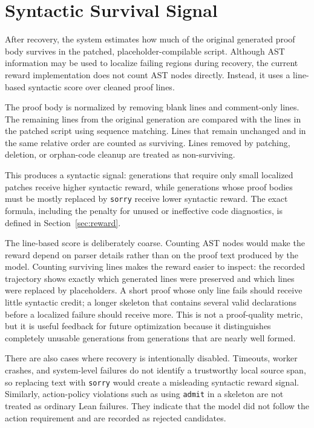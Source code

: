 \documentclass[en]{uet_awesome_thesis/uet-awesome-thesis}
\begin{document}
\section{Syntactic Survival Signal}

After recovery, the system estimates how much of the original generated proof body survives in the
patched, placeholder-compilable script. Although AST information may be used to localize failing
regions during recovery, the current reward implementation does not count AST nodes directly.
Instead, it uses a line-based syntactic score over cleaned proof lines.

The proof body is normalized by removing blank lines and comment-only lines. The remaining lines
from the original generation are compared with the lines in the patched script using sequence matching.
Lines that remain unchanged and in the same relative order are counted as surviving. Lines removed
by patching, deletion, or orphan-code cleanup are treated as non-surviving.

This produces a syntactic signal: generations that require only small localized patches
receive higher syntactic reward, while generations whose proof bodies must be mostly replaced by \texttt{sorry}
receive lower syntactic reward. The exact formula, including the penalty for unused or ineffective code diagnostics,
is defined in Section~\ref{sec:reward}.

The line-based score is deliberately coarse. Counting AST nodes would make the reward depend on parser details rather than on the proof text produced by the model. 
Counting surviving lines makes the reward easier to inspect: the recorded trajectory shows exactly which generated lines were preserved and which lines were replaced by placeholders. 
A short proof whose only line fails should receive little syntactic credit; a longer skeleton that contains several valid declarations before a
localized failure should receive more. This is not a proof-quality metric, but it is useful feedback for
future optimization because it distinguishes completely unusable generations from generations that are
nearly well formed.

There are also cases where recovery is intentionally disabled. Timeouts, worker crashes, and system-level
failures do not identify a trustworthy local source span, so replacing text with \texttt{sorry} would create a
misleading syntactic reward signal. Similarly, action-policy violations such as using \texttt{admit} in a skeleton are
not treated as ordinary Lean failures. They indicate that the model did not follow the action requirement and
are recorded as rejected candidates.
\end{document}
